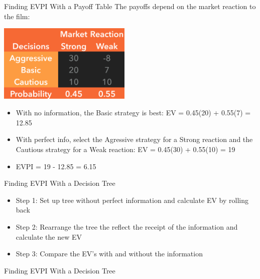 \documentclass{beamer}\usepackage[]{graphicx}\usepackage[]{color}
\begin{document}
\begin{darkframes}
    \begin{frame}[fragile]{Finding EVPI With a Payoff Table}
      \fontsize{10}{10}\selectfont
      The payoffs depend on the market reaction to the film:
        \begin{center}
        \includegraphics[width=2.5in]{BevoPayoffs} 
        \end{center}
        \begin{itemize} [<+->]
          \item With no information, the Basic strategy is best: EV = 0.45(20) + 0.55(7) = 12.85
          \item With perfect info, select the Agressive strategy for a Strong reaction and the Cautious strategy for a Weak reaction: EV = 0.45(30) + 0.55(10) = 19
          \item EVPI = 19 - 12.85 = 6.15
        \end{itemize}        
    \end{frame}     



    \begin{frame}[fragile]{Finding EVPI With a Decision Tree}
       \fontsize{10}{10}\selectfont   
          \begin{itemize} [<+->]
            \item Step 1: Set up tree without perfect information and calculate EV by rolling back
            \item Step 2: Rearrange the tree the reflect the receipt of the information and calculate the new EV
            \item Step 3: Compare the EV's with and without the information
          \end{itemize}          

    \end{frame}


    \begin{frame}[fragile]{Finding EVPI With a Decision Tree}
      \fontsize{10}{10}\selectfont


\end{frame}
\end{darkframes}
\end{document}
